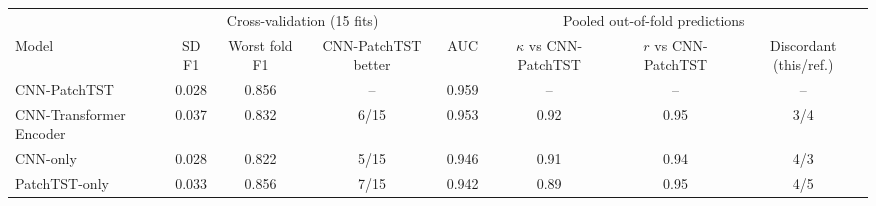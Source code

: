 \begin{tabular}{lccccccc}
\toprule
 & \multicolumn{3}{c}{Cross-validation (15 fits)} & \multicolumn{4}{c}{Pooled out-of-fold predictions} \\
\cmidrule(lr){2-4}\cmidrule(lr){5-8}
Model & SD F1 & Worst fold F1 & CNN-PatchTST better & AUC & $\kappa$ vs CNN-PatchTST & $r$ vs CNN-PatchTST & Discordant (this/ref.) \\
\midrule
CNN-PatchTST & 0.028 & 0.856 & -- & 0.959 & -- & -- & -- \\
CNN-Transformer Encoder & 0.037 & 0.832 & 6/15 & 0.953 & 0.92 & 0.95 & 3/4 \\
CNN-only & 0.028 & 0.822 & 5/15 & 0.946 & 0.91 & 0.94 & 4/3 \\
PatchTST-only & 0.033 & 0.856 & 7/15 & 0.942 & 0.89 & 0.95 & 4/5 \\
\bottomrule
\end{tabular}
